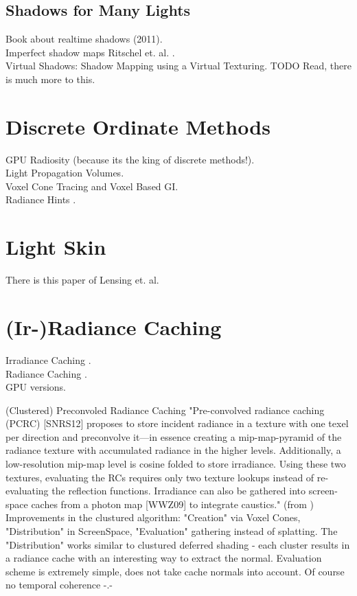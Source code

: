 \documentclass[thesis.tex]{subfiles}
\begin{document}
\subsection{Shadows for Many Lights}
Book about realtime shadows (2011)\cite{bib:realtimeshadowsbook}.\\
Imperfect shadow maps Ritschel et. al. \cite{bib:imperfectshadowmaps}.\\

Virtual Shadows: Shadow Mapping using a Virtual Texturing. TODO Read, there is much more to this. \cite{bib:virtualshadowmaps}

\section{Discrete Ordinate Methods}
GPU Radiosity (because its the king of discrete methods!).\\
Light Propagation Volumes.\\
Voxel Cone Tracing and Voxel Based GI.\\
Radiance Hints \cite{bib:radiancehints}.

\section{Light Skin}
There is this paper \cite{bib:LightskinPaper} of Lensing et. al.

\section{(Ir-)Radiance Caching}
Irradiance Caching \cite{bib:irradiancecaching}.\\
Radiance Caching \cite{bib:radiancecaching}.\\
GPU versions.


(Clustered) Preconvoled Radiance Caching \cite{bib:clusteredpreconvoledradiancecaching}
"Pre-convolved radiance caching (PCRC) [SNRS12] proposes to store incident radiance in a texture with one texel per direction and preconvolve it—in essence creating a mip-map-pyramid of the
radiance texture with accumulated radiance in the higher
levels. Additionally, a low-resolution mip-map level is cosine folded to store irradiance. Using these two textures, evaluating the RCs requires only two texture lookups instead of re-evaluating the reflection functions. Irradiance can also be gathered into screen-space caches from a photon map [WWZ09] to integrate caustics." (from \cite{bib:clusteredpreconvoledradiancecaching})\\
Improvements in the clustured algorithm: "Creation" via Voxel Cones, "Distribution" in ScreenSpace, "Evaluation" gathering instead of splatting. The "Distribution" works similar to clustured deferred shading - each cluster results in a radiance cache with an interesting way to extract the normal. Evaluation scheme is extremely simple, does not take cache normals into account. Of course no temporal coherence -.-
\end{document}
